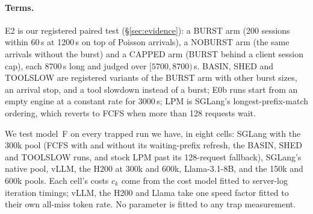 \paragraph{Terms.} E2 is our registered paired test (\S\ref{sec:evidence}): a BURST arm (200 sessions within 60\,s at
1200\,s on top of Poisson arrivals), a NOBURST arm (the same arrivals without the burst) and a CAPPED arm (BURST behind a client
session cap), each 8700\,s long and judged over $[5700,8700)$\,s. BASIN, SHED and TOOLSLOW are registered variants of the BURST arm
with other burst sizes, an arrival stop, and a tool slowdown instead of a burst; E0b runs start from an empty engine at a constant
rate for 3000\,s; LPM is SGLang's longest-prefix-match ordering, which reverts to FCFS when more than 128 requests wait.

We test model~F on every trapped run we have, in eight cells: SGLang with the 300k pool (FCFS with and without its
waiting-prefix refresh, the BASIN, SHED and TOOLSLOW runs, and stock LPM past its 128-request fallback), SGLang's native pool,
vLLM, the H200 at 300k and 600k, Llama-3.1-8B, and the 150k and 600k pools. Each cell's costs $c_k$ come from the cost model
fitted to server-log iteration timings; vLLM, the H200 and Llama take one speed factor fitted to their own all-miss token rate.
No parameter is fitted to any trap measurement.

